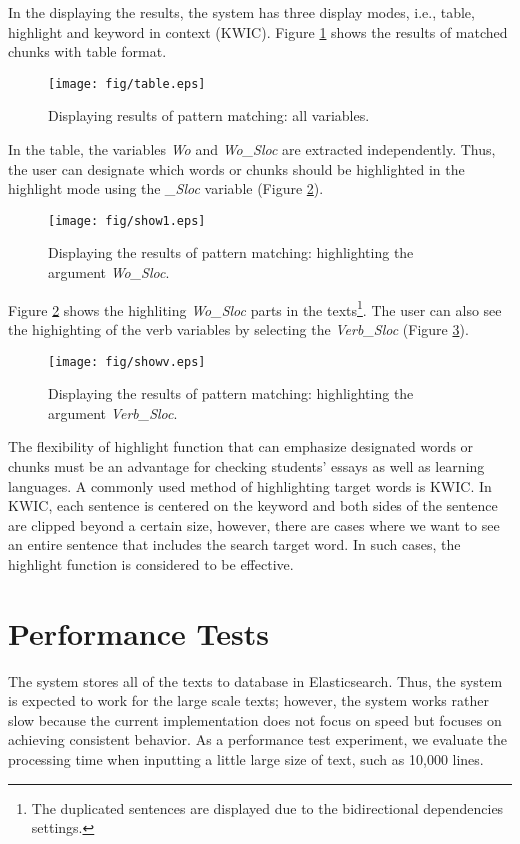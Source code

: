 \documentclass[conference]{IEEEtran}
\begin{document}
In the displaying the results, the system has three display modes, i.e.,
table, highlight and keyword in context (KWIC).
Figure \ref{fig:table} shows the results of matched chunks with table format.

\begin{figure}[htbp]
  \centerline{\texttt{[image: fig/table.eps]}}
  \caption{Displaying results of pattern matching: all variables.}
  \label{fig:table}
\end{figure}

In the table, the variables {\it Wo} and {\it Wo\_Sloc} are extracted
independently. Thus, the user can designate which words or chunks should be highlighted in
the highlight mode using the {\it \_Sloc} variable (Figure \ref{fig:show1}).

\begin{figure}[htbp]
  \centerline{\texttt{[image: fig/show1.eps]}}
  \caption{Displaying the results of pattern matching: highlighting the argument {\it Wo\_Sloc}.}
  \label{fig:show1}
\end{figure}

Figure \ref{fig:show1} shows the highliting {\it Wo\_Sloc} parts in the texts\footnote{The duplicated
  sentences are displayed due to the bidirectional dependencies settings.}.
The user can also see the highighting of the verb variables by selecting the {\it Verb\_Sloc} (Figure \ref{fig:showv}).

\begin{figure}[htbp]
  \centerline{\texttt{[image: fig/showv.eps]}}
  \caption{Displaying the results of pattern matching: highlighting the argument {\it Verb\_Sloc}.}
  \label{fig:showv}
\end{figure}

The flexibility of highlight function that can emphasize designated words or chunks must be an advantage for checking students' essays as well as learning languages. A commonly used method of highlighting target words is KWIC. In KWIC, each sentence is centered on the keyword and both sides of the sentence are clipped beyond a certain size, however, there are cases where we want to see an entire sentence that includes the search target word. In such cases, the highlight function is considered to be effective.

\section{Performance Tests}
\label{sec:experiment}
The system stores all of the texts to database in Elasticsearch. Thus,
the system is expected to work for the large scale texts; however, the
system works rather slow because the current implementation does not
focus on speed but focuses on achieving consistent behavior.  As a
performance test experiment, we evaluate the processing time when
inputting a little large size of text, such as 10,000 lines.
\end{document}
